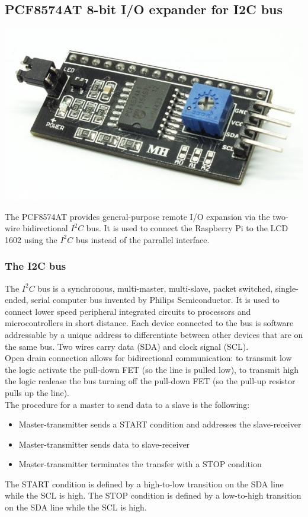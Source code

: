\documentclass[]{article}
\begin{document}
\subsection{PCF8574AT 8-bit I/O expander for I2C bus}
\begin{center}
    \includegraphics[scale=0.2]{io_expander}
\end{center}
The PCF8574AT provides general-purpose remote I/O expansion via the two-wire bidirectional $ I^2C $ bus. It is used to connect the Raspberry Pi to the LCD 1602
using the $ I^2 C $ bus instead of the parrallel interface.

\subsubsection{The I2C bus}
The $ I^2C $ bus is a synchronous, multi-master, multi-slave, packet switched, single-ended, serial computer bus invented by Philips Semiconductor.
It is used to connect lower speed peripheral integrated circuits to processors and microcontrollers in short distance. 
Each device connected to the bus is software addressable by a unique address to differentiate between other devices that are on the same bus. 
Two wires carry data (SDA) and clock signal (SCL). \\
Open drain connection allows for bidirectional communication: to transmit low the logic activate the pull-down FET (so the line is pulled low), 
to transmit high the logic realease the bus turning off the pull-down FET (so the pull-up resistor pulls up the line). \\
The procedure for a master to send data to a slave is the following: 
\begin{itemize}
    \item Master-transmitter sends a START condition and addresses the slave-receiver 
    \item Master-transmitter sends data to slave-receiver 
    \item Master-transmitter terminates the transfer with a STOP condition 
\end{itemize}
The START condition is defined by a high-to-low transition on the SDA line while the SCL is high. The STOP condition is defined by a low-to-high transition 
on the SDA line while the SCL is high.
\end{document}
